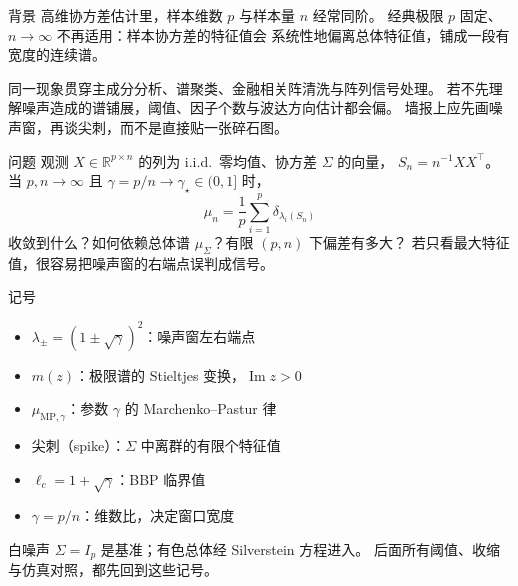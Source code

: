 \documentclass[UTF8,fontset=none]{ctexart}
\begin{document}
\makeposterbanner
\begin{postercolumns}

\begin{postercolumn}

\begin{posterblock}{背景}
  高维协方差估计里，样本维数 $p$ 与样本量 $n$ 经常同阶。
  经典极限 $p$ 固定、$n\to\infty$ 不再适用：样本协方差的特征值会
  \textcolor{rppine}{系统性地}偏离总体特征值，铺成一段有宽度的连续谱。

  同一现象贯穿主成分分析、谱聚类、金融相关阵清洗与阵列信号处理。
  若不先理解噪声造成的谱铺展，阈值、因子个数与波达方向估计都会偏。
  墙报上应先画噪声窗，再谈尖刺，而不是直接贴一张碎石图。
\end{posterblock}

\posterblockgap

\begin{posterblock}{问题}
  观测 $X\in\mathbb{R}^{p\times n}$ 的列为 i.i.d.\ 零均值、协方差 $\Sigma$ 的向量，
  $S_n=n^{-1}XX^\top$。当 $p,n\to\infty$ 且 $\gamma=p/n\to\gamma_\star\in(0,1]$ 时，
  \[
    \mu_n=\frac1p\sum_{i=1}^p \delta_{\lambda_i(S_n)}
  \]
  收敛到什么？如何依赖总体谱 $\mu_\Sigma$？有限 $(p,n)$ 下偏差有多大？
  若只看最大特征值，很容易把噪声窗的右端点误判成信号。
\end{posterblock}

\posterblockgap

\begin{posterblock}[posterquiet]{记号}
  \begin{itemize}
    \item $\lambda_\pm=(1\pm\sqrt{\gamma})^2$：噪声窗左右端点
    \item $m(z)$：极限谱的 Stieltjes 变换，$\operatorname{Im}z>0$
    \item $\mu_{\mathrm{MP},\gamma}$：参数 $\gamma$ 的 Marchenko--Pastur 律
    \item 尖刺（spike）：$\Sigma$ 中离群的有限个特征值
    \item $\ell_c=1+\sqrt{\gamma}$：BBP 临界值
    \item $\gamma=p/n$：维数比，决定窗口宽度
  \end{itemize}
  白噪声 $\Sigma=I_p$ 是基准；有色总体经 Silverstein 方程进入。
  后面所有阈值、收缩与仿真对照，都先回到这些记号。
\end{posterblock}
\end{postercolumn}

\begin{postercolumn}


\end{postercolumn}
\end{postercolumns}
\end{document}

